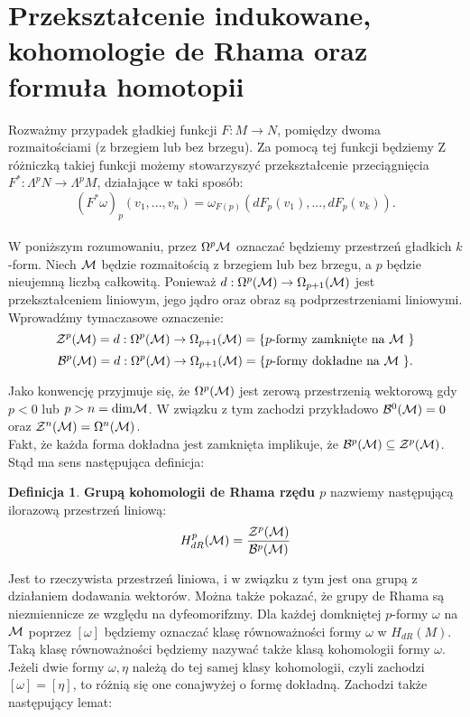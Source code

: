 \documentclass[licencjacka]{pracamgr}
\theoremstyle{definition}
\newtheorem{definition}{Definicja}[section]
\theoremstyle{definition}
\theoremstyle{plain}
\theoremstyle{plain}
\def\M{\ensuremath\mathcal{M}}
\begin{document}


\section{Przekształcenie indukowane, kohomologie de Rhama oraz formuła homotopii}
Rozważmy przypadek gładkiej funkcji $F: M \rightarrow N$, pomiędzy dwoma rozmaitościami
(z brzegiem lub bez brzegu). Za pomocą tej funkcji będziemy 
Z różniczką takiej funkcji możemy stowarzyszyć przekształcenie
przeciągnięcia $F^\ast: \Lambda^p N \rightarrow \Lambda^p M$, działające w taki sposób:
\[
    (F^\ast \omega)_p(v_1, ..., v_n) =
        \omega_{F(p)}(dF_p(v_1), ..., dF_p(v_k)).
\] \\


W poniższym rozumowaniu, przez $\Omega^p \M$ oznaczać będziemy
przestrzeń gładkich $k$-form.  Niech $\M$ będzie rozmaitością z
brzegiem lub bez brzegu, a $p$ będzie nieujemną liczbą całkowitą.
Ponieważ $d: \Omega^p (\M ) \rightarrow \Omega_{p+1}(\M) $ jest
przekształceniem liniowym, jego jądro oraz obraz są podprzestrzeniami
liniowymi. Wprowadźmy tymaczasowe oznaczenie:
\[
\mathcal{Z}^p ( \M ) =
d: \Omega^{p} (\M ) \rightarrow \Omega_{p+1}(\M) =
\{\text{$p$-formy zamknięte na $\M$ } \}
\]
\[
\mathcal{B}^p ( \M ) =
d: \Omega^{p} (\M ) \rightarrow \Omega_{p+1}(\M) =
\{\text{$p$-formy dokładne na $\M$ } \}.
\]

Jako konwencję przyjmuje się, że $\Omega^{p} ( \M ) $ jest zerową
przestrzenią wektorową gdy $p < 0$ lub $p > n = \text{dim} \M $. W
związku z tym zachodzi przykładowo $\mathcal{B}^0(\M)=0$ oraz
$\mathcal{Z}^n(\M)= \Omega^n(\M)$. \\

Fakt, że każda forma dokładna jest zamknięta implikuje, że
$ \mathcal{B}^p ( \M) \subseteq \mathcal{Z}^p ( \M) $.
Stąd ma sens następująca definicja:

\begin{definition}
  \textbf{Grupą kohomologii de Rhama rzędu $p$} nazwiemy następującą
  ilorazową przestrzeń liniową:
  \[
  H^{p}_{dR} ( \M ) = \frac {\mathcal{Z}^p ( \M )} {\mathcal{B}^p ( \M )}
  \]
\end{definition}
Jest to rzeczywista przestrzeń liniowa, i w związku z tym jest ona
grupą z działaniem dodawania wektorów. Można także pokazać, że grupy de Rhama są
niezmiennicze ze względu na dyfeomorifzmy. Dla każdej domkniętej $p$-formy
$\omega$ na $\M$ poprzez $[\omega]$ będziemy oznaczać klasę równoważności
formy $\omega$ w $H_{dR} (M)$. Taką klasę równoważności będziemy nazywać także klasą
kohomologii formy $\omega$. Jeżeli dwie formy $\omega, \eta$ należą do tej samej klasy
kohomologii, czyli zachodzi $[\omega] = [\eta]$, to różnią się one conajwyżej o formę
dokładną. Zachodzi także następujący lemat:
\end{document}
